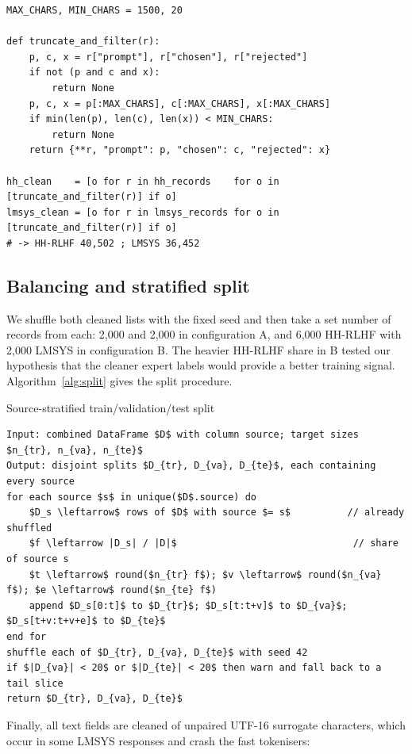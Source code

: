 \begin{lstlisting}[caption={Uniform truncate-and-filter applied to both sources.}, label={lst:filter}]
MAX_CHARS, MIN_CHARS = 1500, 20

def truncate_and_filter(r):
    p, c, x = r["prompt"], r["chosen"], r["rejected"]
    if not (p and c and x):
        return None
    p, c, x = p[:MAX_CHARS], c[:MAX_CHARS], x[:MAX_CHARS]
    if min(len(p), len(c), len(x)) < MIN_CHARS:
        return None
    return {**r, "prompt": p, "chosen": c, "rejected": x}

hh_clean    = [o for r in hh_records    for o in [truncate_and_filter(r)] if o]
lmsys_clean = [o for r in lmsys_records for o in [truncate_and_filter(r)] if o]
# -> HH-RLHF 40,502 ; LMSYS 36,452
\end{lstlisting}

\subsection{Balancing and stratified split}
We shuffle both cleaned lists with the fixed seed and then take a set number of records from each: 2,000 and 2,000 in configuration A, and 6,000 HH-RLHF with 2,000 LMSYS in configuration B. The heavier HH-RLHF share in B tested our hypothesis that the cleaner expert labels would provide a better training signal. Algorithm~\ref{alg:split} gives the split procedure.

\begin{algobox}{Source-stratified train/validation/test split}\label{alg:split}
\begin{lstlisting}[style=algo]
Input: combined DataFrame $D$ with column source; target sizes $n_{tr}, n_{va}, n_{te}$
Output: disjoint splits $D_{tr}, D_{va}, D_{te}$, each containing every source
for each source $s$ in unique($D$.source) do
    $D_s \leftarrow$ rows of $D$ with source $= s$          // already shuffled
    $f \leftarrow |D_s| / |D|$                               // share of source s
    $t \leftarrow$ round($n_{tr} f$); $v \leftarrow$ round($n_{va} f$); $e \leftarrow$ round($n_{te} f$)
    append $D_s[0:t]$ to $D_{tr}$; $D_s[t:t+v]$ to $D_{va}$; $D_s[t+v:t+v+e]$ to $D_{te}$
end for
shuffle each of $D_{tr}, D_{va}, D_{te}$ with seed 42
if $|D_{va}| < 20$ or $|D_{te}| < 20$ then warn and fall back to a tail slice
return $D_{tr}, D_{va}, D_{te}$
\end{lstlisting}
\end{algobox}

Finally, all text fields are cleaned of unpaired UTF-16 surrogate characters, which occur in some LMSYS responses and crash the fast tokenisers:

